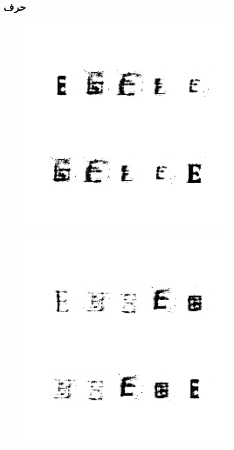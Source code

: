 \documentclass{article}
\begin{document}
\subsection{حرف }
\begin{figure}[H]
	\centerline{\includegraphics[width=\textwidth , height=\textheight ]{../results/CGAN_Adam/figs/letters/E/95.pdf}}
\end{figure}
\begin{figure}[H]
	\centerline{\includegraphics[width=\textwidth , height=\textheight ]{../results/CGAN_Adam/figs/letters/E/90.pdf}}
\end{figure}
\end{document}
